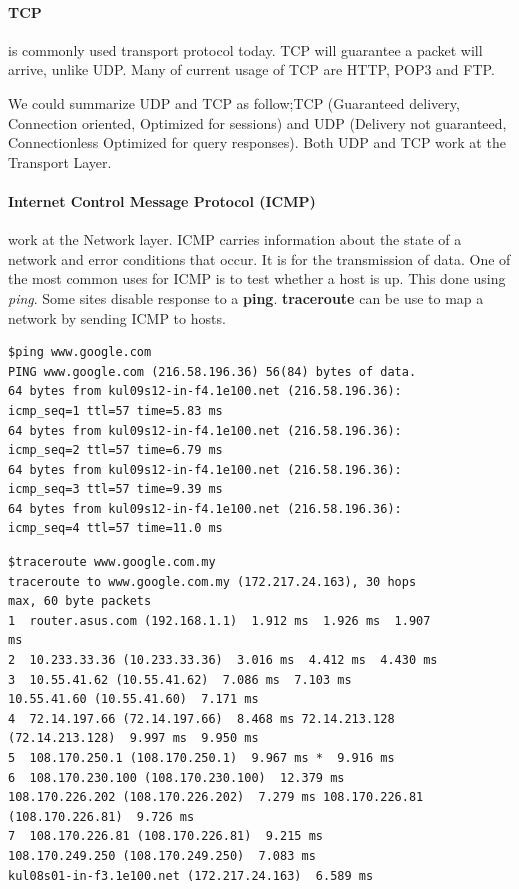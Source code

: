 \documentclass[7x9]{times}
\begin{document}
\paragraph{TCP} is commonly used transport protocol today. 
TCP will guarantee a packet will arrive, unlike UDP\@. Many 
of current usage of TCP are HTTP, POP3 and FTP\@.


We could summarize UDP and TCP as follow;TCP (Guaranteed
delivery, Connection oriented, Optimized for sessions) and
UDP (Delivery not guaranteed, Connectionless Optimized for
query responses). Both UDP and TCP work at the Transport
Layer.

\paragraph{Internet Control Message Protocol (ICMP)} work at
the Network layer. ICMP carries information about the state
of a network and error conditions that occur. It is for the
transmission of data. One of the most common uses for ICMP 
is to test whether a host is up. This done using 
\textit{ping}. Some sites disable response to a 
\textbf{ping}. \textbf{traceroute} can be use to map a 
network by sending ICMP to hosts.

\begin{verbatim}
$ping www.google.com
PING www.google.com (216.58.196.36) 56(84) bytes of data.
64 bytes from kul09s12-in-f4.1e100.net (216.58.196.36): 
icmp_seq=1 ttl=57 time=5.83 ms
64 bytes from kul09s12-in-f4.1e100.net (216.58.196.36): 
icmp_seq=2 ttl=57 time=6.79 ms
64 bytes from kul09s12-in-f4.1e100.net (216.58.196.36): 
icmp_seq=3 ttl=57 time=9.39 ms
64 bytes from kul09s12-in-f4.1e100.net (216.58.196.36): 
icmp_seq=4 ttl=57 time=11.0 ms
\end{verbatim}

\begin{verbatim}
$traceroute www.google.com.my
traceroute to www.google.com.my (172.217.24.163), 30 hops 
max, 60 byte packets
1  router.asus.com (192.168.1.1)  1.912 ms  1.926 ms  1.907 
ms
2  10.233.33.36 (10.233.33.36)  3.016 ms  4.412 ms  4.430 ms
3  10.55.41.62 (10.55.41.62)  7.086 ms  7.103 ms 
10.55.41.60 (10.55.41.60)  7.171 ms
4  72.14.197.66 (72.14.197.66)  8.468 ms 72.14.213.128 
(72.14.213.128)  9.997 ms  9.950 ms
5  108.170.250.1 (108.170.250.1)  9.967 ms *  9.916 ms
6  108.170.230.100 (108.170.230.100)  12.379 ms 
108.170.226.202 (108.170.226.202)  7.279 ms 108.170.226.81 
(108.170.226.81)  9.726 ms
7  108.170.226.81 (108.170.226.81)  9.215 ms 
108.170.249.250 (108.170.249.250)  7.083 ms 
kul08s01-in-f3.1e100.net (172.217.24.163)  6.589 ms
\end{verbatim}
\end{document}
